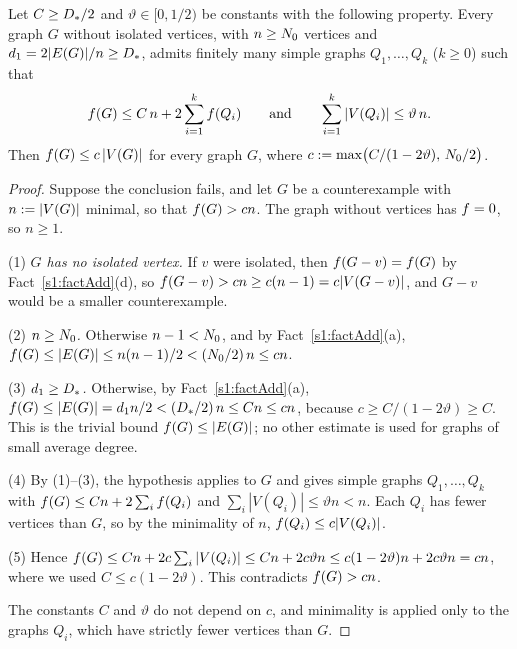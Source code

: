 \begin{theorem}\label{s7:thmHI}
Let $C\ge D_{*}/2$ and $\vartheta\in[0,1/2)$ be constants with the
following property. Every graph $G$ without isolated vertices, with $n\ge N_{0}$
vertices and $d_1=2|E(G)|/n\ge D_{*}$, admits finitely many simple graphs
$Q_1,\dots,Q_k$ ($k\ge0$) such that
\[
f(G)\le C\,n+2\sum_{i=1}^{k}f(Q_i)\qquad\text{and}\qquad\sum_{i=1}^{k}|V(Q_i)|\le\vartheta\,n .
\]
Then $f(G)\le c\,|V(G)|$ for every graph $G$, where
$c\mathrel{:=}\max\bigl(C/(1-2\vartheta),\,N_{0}/2\bigr)$.
\deps{\ref{s1:factAdd}, \ref{s1:defObject}, \ref{s1:defConstants}}
\end{theorem}

\begin{proof}
Suppose the conclusion fails, and let $G$ be a counterexample with
$n\mathrel{:=}|V(G)|$ minimal, so that $f(G)>cn$. The graph without vertices has
$f=0$, so $n\ge1$.

(1) \emph{$G$ has no isolated vertex.} If $v$ were isolated, then
$f(G-v)=f(G)$ by Fact~\ref{s1:factAdd}(d), so
$f(G-v)>cn\ge c(n-1)=c|V(G-v)|$, and $G-v$ would be a smaller counterexample.

(2) \emph{$n\ge N_{0}$.} Otherwise $n-1<N_{0}$, and by Fact~\ref{s1:factAdd}(a),
$f(G)\le|E(G)|\le n(n-1)/2<(N_{0}/2)\,n\le cn$.

(3) \emph{$d_1\ge D_{*}$.} Otherwise, by Fact~\ref{s1:factAdd}(a),
$f(G)\le|E(G)|=d_1n/2<(D_{*}/2)\,n\le Cn\le cn$, because
$c\ge C/(1-2\vartheta)\ge C$. This is the trivial bound $f(G)\le|E(G)|$; no
other estimate is used for graphs of small average degree.

(4) By (1)--(3), the hypothesis applies to $G$ and gives simple graphs
$Q_1,\dots,Q_k$ with $f(G)\le Cn+2\sum_if(Q_i)$ and
$\sum_i|V(Q_i)|\le\vartheta n<n$. Each $Q_i$ has fewer vertices than $G$, so by
the minimality of $n$, $f(Q_i)\le c|V(Q_i)|$.

(5) Hence $f(G)\le Cn+2c\sum_i|V(Q_i)|\le Cn+2c\vartheta n
\le c(1-2\vartheta)n+2c\vartheta n=cn$, where we used $C\le c(1-2\vartheta)$.
This contradicts $f(G)>cn$.

The constants $C$ and $\vartheta$ do not depend on $c$, and minimality is applied
only to the graphs $Q_i$, which have strictly fewer vertices than $G$.
\end{proof}

